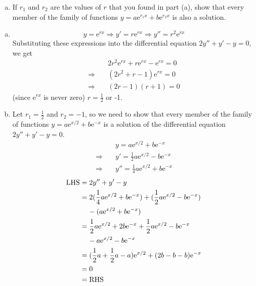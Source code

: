 \begin{enumerate}
\begin{Question}
\begin{enumerate}[(a)]
\item If $r_1$ and $r_2$ are the values of $r$ that you found in part (a), show that every member of the family of functions $y = a\text{e}^{r_{1}x} + b\text{e}^{r_{2}x}$ is also a solution.
\end{enumerate}
\end{Question}

\begin{Solution}
\begin{enumerate}[(a)]
\item \begin{equation*}
		y = \text{e}^{rx} \Rightarrow
		y' = r\text{e}^{rx} \Rightarrow
		y'' = r^2\text{e}^{rx}
	\end{equation*}
	Substituting these expressions into the differential equation 
	$2y'' + y' - y = 0$, we get
	\begin{align*}
		&2r^2\text{e}^{rx} + r\text{e}^{rx} - \text{e}^{rx} = 0 \\
		\Rightarrow \quad &(2r^2 + r - 1)\text{e}^{rx} = 0 \\
		\Rightarrow \quad &(2r - 1)(r + 1) = 0
	\end{align*}
	(since $\text{e}^{rx}$ is never zero) $r = \frac{1}{2}$ or -1.

\item Let $r_1 = \frac{1}{2}$ and $r_2 = -1$, so we need to show that every member of the family of functions $y = a\text{e}^{x/2} + b\text{e}^{-x}$ is a solution of the differential equation $2y'' + y' - y = 0$.\\
\begin{align*}
	&y = a\text{e}^{x/2} + b\text{e}^{-x} \\
	\Rightarrow \quad &y' = \frac{1}{2}a\text{e}^{x/2} - b\text{e}^{-x}\\
	\Rightarrow \quad &y'' = \frac{1}{4}a\text{e}^{x/2} + b\text{e}^{-x}
\end{align*}
\begin{align*}
	\text{LHS} &= 2y'' + y' - y \\ 
	&= 2(\frac{1}{4}a\text{e}^{x/2} + b\text{e}^{-x}) + (\frac{1}{2}a\text{e}^{x/2} - b\text{e}^{-x}) \\ & \hspace{4mm}- (a\text{e}^{x/2} + b\text{e}^{-x}) \\
	&= \frac{1}{2}a\text{e}^{x/2} + 2b\text{e}^{-x} + \frac{1}{2}a\text{e}^{x/2} - b\text{e}^{-x}  \\
	& \hspace{4mm}- a\text{e}^{x/2} - b\text{e}^{-x} \\
	&= (\frac{1}{2}a + \frac{1}{2}a - a)\text{e}^{x/2} + (2b - b -b)\text{e}^{-x} \\
	&= 0 \\ &= \text{RHS}
\end{align*}
\end{enumerate}
\end{Solution}


\end{enumerate}
